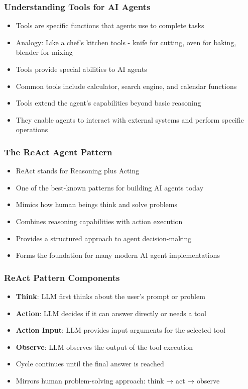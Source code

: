 \begin{frame}[fragile]\frametitle{Understanding Tools for AI Agents}
      \begin{itemize}
        \item Tools are specific functions that agents use to complete tasks
        \item Analogy: Like a chef's kitchen tools - knife for cutting, oven for baking, blender for mixing
        \item Tools provide special abilities to AI agents
        \item Common tools include calculator, search engine, and calendar functions
        \item Tools extend the agent's capabilities beyond basic reasoning
        \item They enable agents to interact with external systems and perform specific operations
      \end{itemize}
\end{frame}

\begin{frame}[fragile]\frametitle{The ReAct Agent Pattern}
      \begin{itemize}
        \item ReAct stands for Reasoning plus Acting
        \item One of the best-known patterns for building AI agents today
        \item Mimics how human beings think and solve problems
        \item Combines reasoning capabilities with action execution
        \item Provides a structured approach to agent decision-making
        \item Forms the foundation for many modern AI agent implementations
      \end{itemize}
\end{frame}

\begin{frame}[fragile]\frametitle{ReAct Pattern Components}
      \begin{itemize}
        \item \textbf{Think}: LLM first thinks about the user's prompt or problem
        \item \textbf{Action}: LLM decides if it can answer directly or needs a tool
        \item \textbf{Action Input}: LLM provides input arguments for the selected tool
        \item \textbf{Observe}: LLM observes the output of the tool execution
        \item Cycle continues until the final answer is reached
        \item Mirrors human problem-solving approach: think → act → observe
      \end{itemize}
\end{frame}

